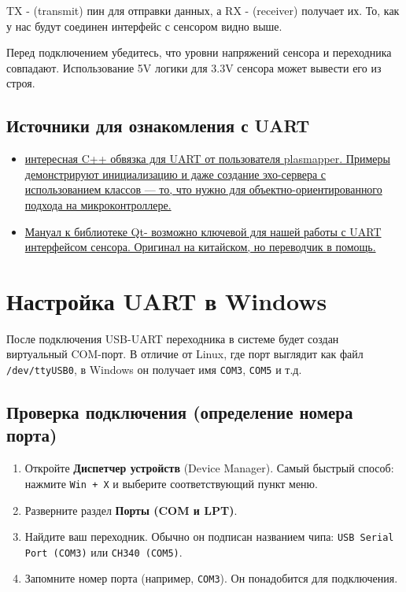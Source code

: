 \documentclass[12pt,a4paper]{article}
\begin{document}
TX - (transmit) пин для отправки данных, а RX - (receiver) получает их. То, как у нас будут соединен интерфейс с сенсором видно выше.

\begin{center}
\end{center}

\begin{tcolorbox}[colback=red!5!white, colframe=red!75!black, title=Важно!]
Перед подключением убедитесь, что уровни напряжений сенсора и переходника совпадают. Использование 5V логики для 3.3V сенсора может вывести его из строя.
\end{tcolorbox}

\subsection{Источники для ознакомления с UART}
\begin{itemize}
    \item \href{https://components.espressif.com/components/plasmapper/pl_uart/versions/1.1.0/examples?language=en}{интересная C++ обвязка для UART от пользователя plasmapper. Примеры демонстрируют инициализацию и даже создание эхо-сервера с использованием классов — то, что нужно для объектно-ориентированного подхода на микроконтроллере.}
    \item \href{https://doc.embedfire.com/linux/rk356x/Qt/zh/latest/lubancat_qt/senior/qt_serialport.html}{Мануал к библиотеке Qt- возможно ключевой для нашей работы с UART интерфейсом сенсора. Оригинал на китайском, но переводчик в помощь.}
\end{itemize}

\section{Настройка UART в Windows}

После подключения USB-UART переходника в системе будет создан виртуальный COM-порт. В отличие от Linux, где порт выглядит как файл \texttt{/dev/ttyUSB0}, в Windows он получает имя \texttt{COM3}, \texttt{COM5} и т.д.

\subsection{Проверка подключения (определение номера порта)}
\begin{enumerate}
    \item Откройте \textbf{Диспетчер устройств} (Device Manager). Самый быстрый способ: нажмите \texttt{Win + X} и выберите соответствующий пункт меню.
    \item Разверните раздел \textbf{Порты (COM и LPT)}.
    \item Найдите ваш переходник. Обычно он подписан названием чипа: \texttt{USB Serial Port (COM3)} или \texttt{CH340 (COM5)}.
    \item Запомните номер порта (например, \texttt{COM3}). Он понадобится для подключения.
\end{enumerate}
\end{document}
